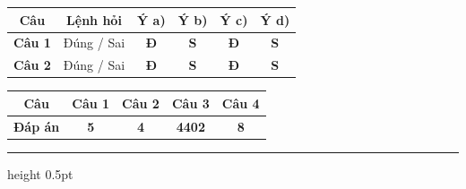 \documentclass[11pt,a4paper]{article}
\begin{document}
\vspace{3pt}
\begin{center}
\renewcommand{\arraystretch}{1.2}
\begin{tabular}{|c|c|c|c|c|c|}
\hline
\rowcolor{tableGreen}
\textbf{Câu} & \textbf{Lệnh hỏi} & \textbf{Ý a)} & \textbf{Ý b)} & \textbf{Ý c)} & \textbf{Ý d)} \\
\hline
\textbf{Câu 1} & Đúng / Sai & \textbf{\color{hfRed}Đ} & \textbf{S} & \textbf{\color{hfRed}Đ} & \textbf{S} \\
\hline
\textbf{Câu 2} & Đúng / Sai & \textbf{\color{hfRed}Đ} & \textbf{S} & \textbf{\color{hfRed}Đ} & \textbf{S} \\
\hline
\end{tabular}
\end{center}

\vspace{3pt}
\begin{center}
\renewcommand{\arraystretch}{1.2}
\begin{tabular}{|c|c|c|c|c|}
\hline
\rowcolor{tableGreen}
\textbf{Câu} & \textbf{Câu 1} & \textbf{Câu 2} & \textbf{Câu 3} & \textbf{Câu 4} \\
\hline
\textbf{Đáp án} & \textbf{\color{hfRed}5} & \textbf{\color{hfRed}4} & \textbf{\color{hfRed}4402} & \textbf{\color{hfRed}8} \\
\hline
\end{tabular}
\end{center}
\vspace{6pt}
\hrule height 0.5pt
\vspace{6pt}

\vspace{4pt}
\end{document}
